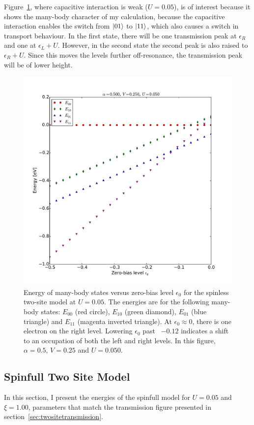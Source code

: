 Figure~\ref{fig:perrinenergy1}, where capacitive interaction is weak ($U=0.05$), is of interest because it shows the many-body character of my calculation, because the capacitive interaction enables the switch from $\ket{01}$ to $\ket{11}$, which also causes a switch in transport behaviour. In the first state, there will be one transmission peak at $\epsilon_R$ and one at $\epsilon_L + U$. However, in the second state the second peak is also raised to $\epsilon_R+U$. Since this moves the levels further off-resonance, the transmission peak will be of lower height. 
\begin{figure}[bt]
    \centering
    \includegraphics[height=.45\textheight]{pdf/energy/perrin_distribution_u1.pdf}
    \caption{Energy of many-body states versus zero-bias level $\epsilon_0$ for the spinless two-site model at $U=0.05$. The energies are for the following many-body states: $E_{00}$ (red circle), $E_{10}$ (green diamond), $E_{01}$ (blue triangle) and $E_{11}$ (magenta inverted triangle). At $\epsilon_0 \approx 0$, there is one electron on the right level. Lowering $\epsilon_0$ past ~$-0.12$ indicates a shift to an occupation of both the left and right levels. In this figure, $\alpha=0.5$, $V=0.25$ and $U=0.050$.}
    \label{fig:perrinenergy1}
\end{figure} 

 
\subsection{Spinfull Two Site Model} 
In this section, I present the energies of the spinfull model for $U=0.05$ and  $\xi=1.00$, parameters that match the transmission figure presented in section~\ref{sec:twositetransmission}.
 
